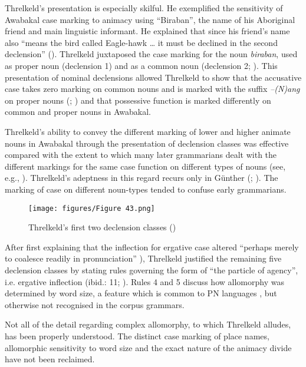 Threlkeld’s presentation is especially skilful. He exemplified the sensitivity of Awabakal case marking to animacy using ``Biraban'', the name of his Aboriginal friend and main linguistic informant. He explained that since his friend’s name also “means the bird called Eagle-hawk … it must be declined in the second declension” (\citealt[13]{threlkeld_australian_1834}). Threlkeld juxtaposed the case marking for the noun \textit{biraban}, used as proper noun (declension 1) and as a common noun (declension 2; ). This presentation of nominal declensions allowed Threlkeld to show that the accusative case takes zero marking on common nouns and is marked with the suffix \textit{–(N)ang} on proper nouns (\citealt[10]{threlkeld_australian_1834}; \citealt[42]{Lissarrague2006}) and that possessive function is marked differently on common and proper nouns in Awabakal.

Threlkeld’s ability to convey the different marking of lower and higher animate nouns in Awabakal through the presentation of declension classes was effective compared with the extent to which many later grammarians dealt with the different markings for the same case function on different types of nouns (see, e.g., ). Threlkeld’s adeptness in this regard recurs only in Günther (\citeyear{gunther_native_1838}; \citeyear{gunther_lecture_1840}). The marking of case on different noun-types tended to confuse early grammarians.

\begin{figure}
\texttt{[image: figures/Figure 43.png]}
\caption{Threlkeld’s first two declension classes (\citeyear[13]{threlkeld_australian_1834})}
\label{fig:3:43}
\label{fig:3.11}
\end{figure}

After first explaining that the inflection for ergative case altered “perhaps merely to coalesce readily in pronunciation” \citep[6]{threlkeld_australian_1834}), Threlkeld justified the remaining five declension classes by stating rules governing the form of ``the particle of agency'', i.e. ergative inflection (ibid.: 11; ). Rules 4 and 5 discuss how allomorphy was determined by word size, a feature which is common to PN languages \citep[152]{baker_word_2014}, but otherwise not recognised in the corpus grammars.

Not all of the detail regarding complex allomorphy, to which Threlkeld alludes, has been properly understood. The distinct case marking of place names, allomorphic sensitivity to word size and the exact nature of the animacy divide have not been reclaimed.

